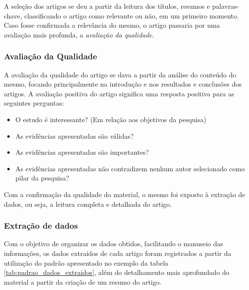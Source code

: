 			A seleção dos artigos se deu a partir da leitura dos títulos, resumos e palavras-chave, classificando o artigo como relevante ou não, em um primeiro momento. Caso fosse confirmada a relevância do mesmo, o artigo passaria por uma avaliação mais profunda, a \textit{avaliação da qualidade}.


		\subsubsection{Avaliação da Qualidade}

			A avaliação da qualidade do artigo se dava a partir da análise do conteúdo do mesmo, focando principalmente na introdução e nos resultados e conclusões dos artigos. A avaliação positiva do artigo significa uma resposta positiva para as seguintes perguntas:

			\begin{itemize}
				\item O estudo é interessante? (Em relação aos objetivos da pesquisa)
				\item As evidências apresentadas são válidas?
				\item As evidências apresentadas são importantes?
				\item As evidências apresentadas não contradizem nenhum autor selecionado como pilar da pesquisa?
			\end{itemize}

			Com a confirmação da qualidade do material, o mesmo foi exposto à extração de dados, ou seja, a leitura completa e detalhada do artigo.

		\subsubsection{Extração de dados}

			Com o objetivo de organizar os dados obtidos, facilitando o manuseio das informações, os dados extraídos de cada artigo foram registrados a partir da utilização do padrão apresentado no exemplo da tabela \ref{tab:padrao_dados_extraidos}, além do detalhamento mais aprofundado do material a partir da criação de um resumo do artigo.

